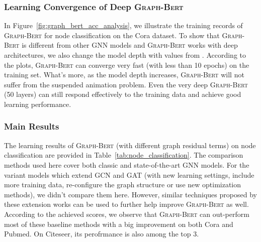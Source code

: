 \documentclass{article}
\newcommand{\our}{\textsc{Graph-Bert}}
\newcommand{\gcn}{\textsc{GCN}}
\newcommand{\gat}{\textsc{GAT}}
\begin{document}
\subsubsection{Learning Convergence of Deep {\our}}

In Figure~\ref{fig:graph_bert_acc_analysis}, we illustrate the training records of {\our} for node classification on the Cora dataset. To show that {\our} is different from other GNN models and {\our} works with deep architectures, we also change the model depth with values from . According to the plots, {\our} can converge very fast (with less than 10 epochs) on the training set. What's more, as the model depth increases, {\our} will not suffer from the suspended animation problem. Even the very deep {\our} (50 layers) can still respond effectively to the training data and achieve good learning performance.



\subsubsection{Main Results}

The learning results of {\our} (with different graph residual terms) on node classification are provided in Table~\ref{tab:node_classification}. The comparison methods used here cover both classic and state-of-the-art GNN models. For the variant models which extend {\gcn} and {\gat} (with new learning settings, include more training data, re-configure the graph structure or use new optimization methods), we didn't compare them here. However, similar techniques proposed by these extension works can be used to further help improve {\our} as well. According to the achieved scores, we observe that {\our} can out-perform most of these baseline methods with a big improvement on both Cora and Pubmed. On Citeseer, its perofrmance is also among the top 3.
\end{document}
